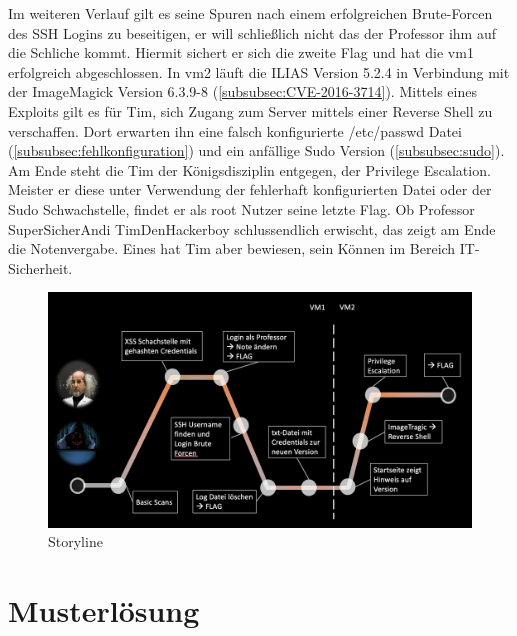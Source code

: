 \documentclass[10pt, a4paper,onecolumn ,titlepage]{article}
\begin{document}
    Im weiteren Verlauf gilt es seine Spuren nach einem erfolgreichen Brute-Forcen des SSH Logins zu beseitigen, er will schließlich nicht das der Professor ihm auf die Schliche kommt.
    Hiermit sichert er sich die zweite Flag und hat die \ac{vm}1 erfolgreich abgeschlossen.
    In \ac{vm}2 läuft die ILIAS Version 5.2.4 in Verbindung mit der ImageMagick Version 6.3.9-8 (\ref{subsubsec:CVE-2016-3714}).
    Mittels eines Exploits gilt es für Tim, sich Zugang zum Server mittels einer Reverse Shell zu verschaffen.
    Dort erwarten ihn eine falsch konfigurierte /etc/passwd Datei (\ref{subsubsec:fehlkonfiguration}) und ein anfällige Sudo Version (\ref{subsubsec:sudo}).
    Am Ende steht die Tim der Königsdisziplin entgegen, der Privilege Escalation.
    Meister er diese unter Verwendung der fehlerhaft konfigurierten Datei oder der Sudo Schwachstelle, findet er als root Nutzer seine letzte Flag.
    Ob Professor SuperSicherAndi TimDenHackerboy schlussendlich erwischt, das zeigt am Ende die Notenvergabe.
    Eines hat Tim aber bewiesen, sein Können im Bereich IT-Sicherheit.

    \begin{figure}[H]
        \centering
        \includegraphics[width=1\textwidth]{other_pictures/storyline}
        \caption{Storyline }
        \label{fig:storylineGraphic}
    \end{figure}



    \section{Musterlösung}
    \label{sec:musterloesung}
\end{document}
